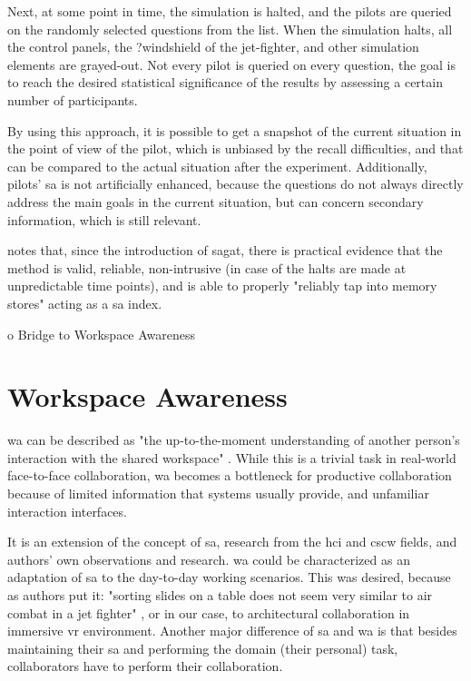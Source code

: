 Next, at some point in time, the simulation is halted, and the pilots are queried on the randomly selected questions from the list. When the simulation halts, all the control panels, the ?windshield of the jet-fighter, and other simulation elements are grayed-out. Not every pilot is queried on every question, the goal is to reach the desired statistical significance of the results by assessing a certain number of participants.

By using this approach, it is possible to get a snapshot of the current situation in the point of view of the pilot, which is unbiased by the recall difficulties, and that can be compared to the actual situation after the experiment. Additionally, pilots' \gls{sa} is not artificially enhanced, because the questions do not always directly address the main goals in the current situation, but can concern secondary information, which is still relevant.

\cite{endsley_direct_nodate} notes that, since the introduction of \gls{sagat}, there is practical evidence that the method is valid, reliable, non-intrusive (in case of the halts are made at unpredictable time points), and is able to properly "reliably tap into memory stores" acting as a \gls{sa} index. 


o Bridge to Workspace Awareness


\section{Workspace Awareness}
\gls{wa} can be described as "the up-to-the-moment understanding of another person’s interaction with the shared workspace" \cite{gutwin_descriptive_2002}. While this is a trivial task in real-world face-to-face collaboration, \gls{wa} becomes a bottleneck for productive collaboration because of limited information that systems usually provide, and unfamiliar interaction interfaces.
 
It is an extension of the concept of \gls{sa}, research from the \gls{hci} and \gls{cscw} fields, and authors' own observations and research. \gls{wa} could be characterized as an adaptation of \gls{sa} to the day-to-day working scenarios. This was desired, because as authors put it: "sorting slides on a table does not seem very similar to air combat in a jet fighter" \cite{gutwin_descriptive_2002}, or in our case, to architectural collaboration in immersive \gls{vr} environment. Another major difference of \gls{sa} and \gls{wa} is that besides maintaining their \gls{sa} and performing the domain (their personal) task, collaborators have to perform their collaboration.

